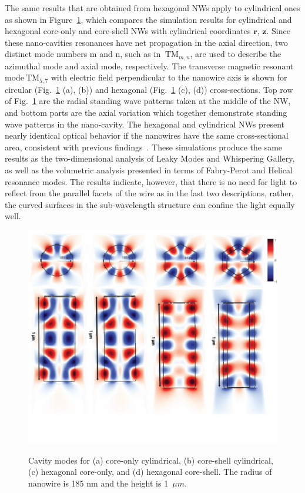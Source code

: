 The same results that are obtained from hexagonal NWs apply to cylindrical ones
as shown in Figure~\ref{structuredep}, which compares the simulation results
for cylindrical and hexagonal core-only and core-shell NWs with cylindrical
coordinates \(\mathbf{r}\), \(\mathbf{z}\). Since these nano-cavities
resonances have net propagation in the axial direction, two distinct mode
numbers m and n, such as in \(\ \text{TM}_{m,n}\), are used to describe the
azimuthal mode and axial mode, respectively. The transverse magnetic resonant
mode\(\ \text{TM}_{5,7}\) with electric field perpendicular to the nanowire
axis is shown for circular (Fig.~\ref{structuredep} (a), (b)) and hexagonal
(Fig.~\ref{structuredep} (c), (d)) cross-sections. Top row of
Fig.~\ref{structuredep} are the radial standing wave patterns taken at the
middle of the NW, and bottom parts are the axial variation which together
demonstrate standing wave patterns in the nano-cavity. The hexagonal and
cylindrical NWs present nearly identical optical behavior if the nanowires have
the same cross-sectional area, consistent with previous
findings~\cite{Henneghien:2009te}. These simulations produce the same results
as the two-dimensional analysis of Leaky Modes and Whispering Gallery, as well
as the volumetric analysis presented in terms of Fabry-Perot and Helical
resonance modes. The results indicate, however, that there is no need for light
to reflect from the parallel facets of the wire as in the last two
descriptions, rather, the curved surfaces in the sub-wavelength structure can
confine the light equally well.

\begin{figure}
  \caption{Cavity modes for (a) core-only cylindrical, (b) core-shell cylindrical, (c) hexagonal core-only, and (d) hexagonal core-shell. The radius of nanowire is 185 nm and the height is 1~$\mu{m}$.}
  \centering
  \includegraphics[width=\textwidth]{pictures/LM/structuredep}
  \label{structuredep}
\end{figure}

